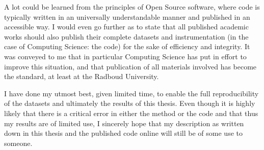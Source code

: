 A lot could be learned from the principles of Open Source software, where code is typically written
in an universally understandable manner and published in an accessible way.
I would even go further as to state that all published academic works should also publish
their complete datasets and instrumentation (in the case of Computing Science: the code)
for the sake of efficiency and integrity.
It was conveyed to me that in particular Computing Science has put in
effort to improve this situation, and that publication of all materials involved has become the standard,
at least at the Radboud University.

I have done my utmost best, given limited time, to enable the full reproducibility of
the datasets and ultimately the results of this thesis.
Even though it is highly likely that there is a critical error in either the method
or the code and that thus my results are of limited use,
I sincerely hope that my description as written down in this thesis and 
the published code online will still be of some use to someone.
